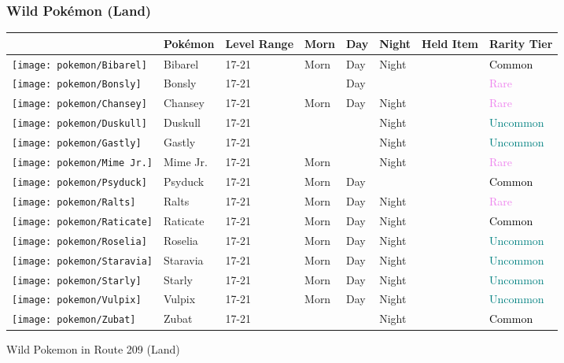 \subsubsection{Wild Pokémon (Land)}%
\label{ssubsec:WildPokmon(Land)}%
\begin{longtable}{||l l l l l l l l||}%
\hline%
&Pokémon&Level Range&Morn&Day&Night&Held Item&Rarity Tier\\%
\hline%
\endhead%
\hline%
\texttt{[image: pokemon/Bibarel]}&Bibarel&17{-}21&Morn&Day&Night&&\textcolor{black}{%
Common%
}\\%
\hline%
\texttt{[image: pokemon/Bonsly]}&Bonsly&17{-}21&&Day&&&\textcolor{violet}{%
Rare%
}\\%
\hline%
\texttt{[image: pokemon/Chansey]}&Chansey&17{-}21&Morn&Day&Night&&\textcolor{violet}{%
Rare%
}\\%
\hline%
\texttt{[image: pokemon/Duskull]}&Duskull&17{-}21&&&Night&&\textcolor{teal}{%
Uncommon%
}\\%
\hline%
\texttt{[image: pokemon/Gastly]}&Gastly&17{-}21&&&Night&&\textcolor{teal}{%
Uncommon%
}\\%
\hline%
\texttt{[image: pokemon/Mime Jr.]}&Mime Jr.&17{-}21&Morn&&Night&&\textcolor{violet}{%
Rare%
}\\%
\hline%
\texttt{[image: pokemon/Psyduck]}&Psyduck&17{-}21&Morn&Day&&&\textcolor{black}{%
Common%
}\\%
\hline%
\texttt{[image: pokemon/Ralts]}&Ralts&17{-}21&Morn&Day&Night&&\textcolor{violet}{%
Rare%
}\\%
\hline%
\texttt{[image: pokemon/Raticate]}&Raticate&17{-}21&Morn&Day&Night&&\textcolor{black}{%
Common%
}\\%
\hline%
\texttt{[image: pokemon/Roselia]}&Roselia&17{-}21&Morn&Day&Night&&\textcolor{teal}{%
Uncommon%
}\\%
\hline%
\texttt{[image: pokemon/Staravia]}&Staravia&17{-}21&Morn&Day&Night&&\textcolor{teal}{%
Uncommon%
}\\%
\hline%
\texttt{[image: pokemon/Starly]}&Starly&17{-}21&Morn&Day&Night&&\textcolor{teal}{%
Uncommon%
}\\%
\hline%
\texttt{[image: pokemon/Vulpix]}&Vulpix&17{-}21&Morn&Day&Night&&\textcolor{teal}{%
Uncommon%
}\\%
\hline%
\texttt{[image: pokemon/Zubat]}&Zubat&17{-}21&&&Night&&\textcolor{black}{%
Common%
}\\%
\hline%
\end{longtable}%
\caption{Wild Pokemon in Route 209 (Land)}